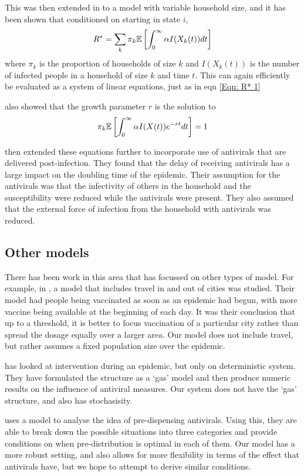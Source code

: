 This was then extended in \cite{Black:2013} to a model with variable household size, and it has been shown that conditioned on starting in state $i$,
$$R^*=\sum_k \pi_k \mathbb{E}\left[\int_0^\infty \alpha I(X_k(t))dt\right]$$
where $\pi_k$ is the proportion of households of size $k$ and $I(X_k(t))$ is the number of infected people in a household of size $k$ and time $t$. This can again efficiently be evaluated as a system of linear equations, just as in eqn \ref{Eqn: R* 1}

\cite{Ross:2010} also showed that the growth parameter $r$ is the solution to
\begin{equation}
\pi_k \mathbb{E}\left[\int_0^\infty \alpha I(X(t))e^{-rt}dt\right]=1
\end{equation}

\cite{Black:2013} then extended these equations further to incorporate use of antivirals that are delivered post-infection. They found that the delay of receiving antivirals has a large impact on the doubling time of the epidemic. Their assumption for the antivirals was that the infectivity of others in the household and the susceptibility were reduced while the antivirals were present. They also assumed that the external force of infection from the household with antivirals was reduced.

\subsection{Other models}
There has been work in this area that has focussed on other types of model. For example, in \cite{Matrajt:2013}, a model that includes travel in and out of cities was studied. Their model had people being vaccinated as soon as an epidemic had begun, with more vaccine being available at the beginning of each day. It was their conclusion that up to a threshold, it is better to focus vaccination of a particular city rather than spread the dosage equally over a larger area. Our model does not include travel, but rather assumes a fixed population size over the epidemic.

\cite{House:2008} has looked at intervention during an epidemic, but only on deterministic system. They have formulated the structure as a `gas' model and then produce numeric results on the influence of antiviral measures. Our system does not have the `gas' structure, and also has stochasisity.

\cite{Goldstein:2010} uses a model to analyse the idea of pre-dispensing antivirals. Using this, they are able to break down the possible situations into three categories and provide conditions on when pre-distribution is optimal in each of them. Our model has a more robust setting, and also allows for more flexibility in terms of the effect that antivirals have, but we hope to attempt to derive similar conditions.


